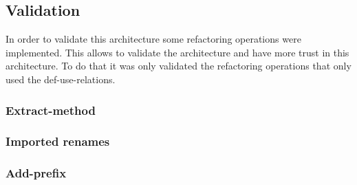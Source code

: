 \subsection{Validation}

In order to validate this architecture some refactoring operations were implemented. 
This allows to validate the architecture and have more trust in this architecture.
To do that it was only validated the refactoring operations that only used the def-use-relations.

\subsubsection{Extract-method}
\subsubsection{Imported renames}
\subsubsection{Add-prefix}

